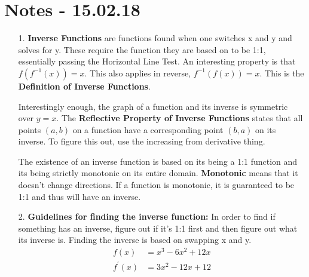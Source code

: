 \documentclass[11pt]{article}
\begin{document}
\section{Notes - 15.02.18}
\begin{itemize}
	\item[1. ] {\bf Inverse Functions} are functions found when one switches x and y and solves for y.  These require the function they are based on to be 1:1, essentially passing the Horizontal Line Test.  An interesting property is that $f(f^{-1}(x)) = x$.  This also applies in reverse, $f^{-1}(f(x)) = x$.  This is the {\bf Definition of Inverse Functions}.
	
	Interestingly enough, the graph of a function and its inverse is symmetric over $y=x$.  The {\bf Reflective Property of Inverse Functions} states that all points $(a, b)$ on a function have a corresponding point $(b, a)$ on its inverse.  To figure this out, use the increasing from derivative thing.
	

	The existence of an inverse function is based on its being a 1:1 function and its being strictly monotonic on its entire domain.  {\bf Monotonic} means that it doesn't change directions.  If a function is monotonic, it is guaranteed to be 1:1 and thus will have an inverse.
		
		\item[2. ] {\bf Guidelines for finding the inverse function:  }In order to find if something has an inverse, figure out if it's 1:1 first and then figure out what its inverse is.  Finding the inverse is based on swapping x and y.
		\begin{align*}
			f(x) &= x^3-6x^2+12x\\
			f^\prime (x) &= 3x^2-12x+12\\
		\end{align*}
\end{itemize}
\section{}
\end{document}
